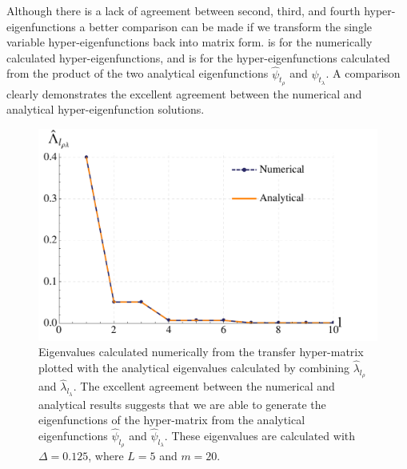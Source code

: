 Although there is a lack of agreement between second, third, and fourth hyper-eigenfunctions a better comparison can be made if we transform the single variable hyper-eigenfunctions back into matrix form.  is for the numerically calculated hyper-eigenfunctions, and  is for the hyper-eigenfunctions calculated from the product of the two analytical eigenfunctions $\hat{\psi}_{t_{\rho}}$ and $\hat{\psi}_{t_{\lambda}}$. A comparison clearly demonstrates the excellent agreement between the numerical and analytical hyper-eigenfunction solutions.

\begin{figure}[H]
\centering \includegraphics[scale=0.5]{Results/Collagen/Eigensystem/Hypermatrix/Eigenvalues/0.125/lambda_t_ij_L5_m20.pdf}
\caption{Eigenvalues calculated numerically from the transfer hyper-matrix plotted with the analytical eigenvalues calculated by combining $\hat{\lambda}_{l_\rho}$ and $\hat{\lambda}_{l_\lambda}$. The excellent agreement between the numerical and analytical results suggests that we are able to generate the eigenfunctions of the hyper-matrix from the analytical eigenfunctions $\hat{\psi}_{l_\rho}$ and $\hat{\psi}_{l_\lambda}$. These eigenvalues are calculated with $\Delta=0.125$, where $L=5$ and $m=20$.}
\label{fig:collagen_eval_nva}
\end{figure}


